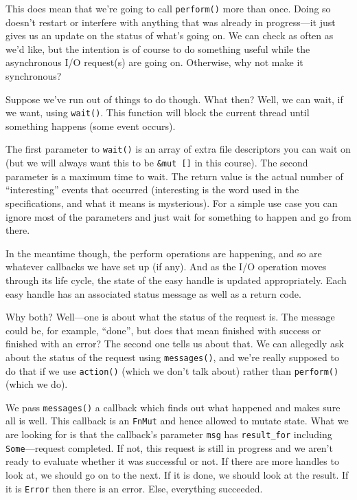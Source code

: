 \documentclass[a4paper]{report}
\begin{document}
This does mean that we're going to call \texttt{perform()} more than once. Doing so doesn't restart or interfere with anything that was already in progress---it just gives us an update on the status of what's going on. We can check as often as we'd like, but the intention is of course to do something useful while the asynchronous I/O request(s) are going on. Otherwise, why not make it synchronous? 

Suppose we've run out of things to do though. What then? Well, we can wait, if we want, using \texttt{wait()}. This function will block the current thread until something happens (some event occurs).

The first parameter to \texttt{wait()} is an array of extra file descriptors you can wait on (but we will always want this to be \texttt{\&mut []} in this course). The second parameter is a maximum time to wait. The return value is the actual number of ``interesting'' events that occurred (interesting is the word used in the specifications, and what it means is mysterious). For a simple use case you can ignore most of the parameters and just wait for something to happen and go from there.

In the meantime though, the perform operations are happening, and so are whatever callbacks we have set up (if any). And as the I/O operation moves through its life cycle, the state of the easy handle is updated appropriately. Each easy handle has an associated status message as well as a return code.

Why both? Well---one is about what the status of the request is. The message could be, for example, ``done'', but does that mean finished with success or finished with an error? The second one tells us about that. We can allegedly ask about the status of the request using \texttt{messages()}, and we're really supposed to do that if we use \texttt{action()} (which we don't talk about) rather than \texttt{perform()} (which we do).

We pass \texttt{messages()} a callback which finds out what happened and makes sure all is well. This callback is an \texttt{FnMut} and hence allowed to mutate state. What we are looking for is that the callback's parameter \texttt{msg} has \texttt{result\_for} including \texttt{Some}---request completed. If not, this request is still in progress and we aren't ready to evaluate whether it was successful or not. If there are more handles to look at, we should go on to the next. If it is done, we should look at the result. If it is \texttt{Error} then there is an error. Else, everything succeeded.
\end{document}
